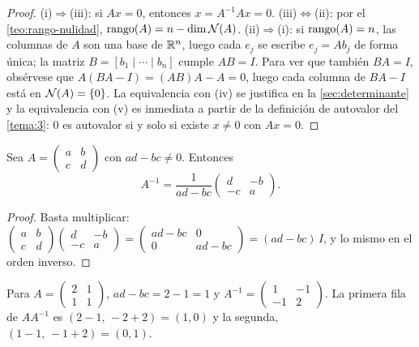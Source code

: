 \begin{proof}
(i)$\Rightarrow$(iii): si $Ax=0$, entonces $x=A^{-1}Ax=0$. (iii)$\Leftrightarrow$(ii): por el \cref{teo:rango-nulidad}, $\operatorname{rango}(A)=n-\dim\mathcal{N}(A)$. (ii)$\Rightarrow$(i): si $\operatorname{rango}(A)=n$, las columnas de $A$ son una base de $\mathbb{R}^{n}$, luego cada $e_j$ se escribe $e_j=Ab_j$ de forma única; la matriz $B=[b_1\mid\cdots\mid b_n]$ cumple $AB=I$. Para ver que también $BA=I$, obsérvese que $A(BA-I)=(AB)A-A=0$, luego cada columna de $BA-I$ está en $\mathcal{N}(A)=\{0\}$. La equivalencia con (iv) se justifica en la \cref{sec:determinante} y la equivalencia con (v) es inmediata a partir de la definición de autovalor del \cref{tema:3}: $0$ es autovalor si y solo si existe $x\ne 0$ con $Ax=0$.
\end{proof}

\begin{proposicion}\label{prop:inversa2}
Sea $A=\begin{pmatrix}a&b\\c&d\end{pmatrix}$ con $ad-bc\ne 0$. Entonces
\[
A^{-1}=\frac{1}{ad-bc}\begin{pmatrix}d&-b\\-c&a\end{pmatrix}.
\]
\end{proposicion}

\begin{proof}
Basta multiplicar: $\begin{pmatrix}a&b\\c&d\end{pmatrix}\begin{pmatrix}d&-b\\-c&a\end{pmatrix}=\begin{pmatrix}ad-bc&0\\0&ad-bc\end{pmatrix}=(ad-bc)\,I$, y lo mismo en el orden inverso.
\end{proof}

\begin{ejemplo}\label{ej:inversa}
Para $A=\begin{pmatrix}2&1\\1&1\end{pmatrix}$, $ad-bc=2-1=1$ y $A^{-1}=\begin{pmatrix}1&-1\\-1&2\end{pmatrix}$. La primera fila de $AA^{-1}$ es $(2-1,\,-2+2)=(1,0)$ y la segunda, $(1-1,\,-1+2)=(0,1)$.
\end{ejemplo}

